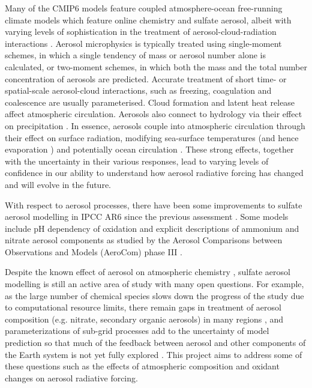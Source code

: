 Many of the CMIP6 models feature coupled atmosphere-ocean free-running climate models which feature online chemistry and sulfate aerosol, albeit with varying levels of sophistication in the treatment of aerosol-cloud-radiation interactions \citep[e.g.][]{zhangBCCESM1ModelDatasets2021, vannoijeECEarth3AerChemGlobalClimate2021, mulcahyDescriptionEvaluationAerosol2020}.  Aerosol microphysics is typically treated using single-moment schemes, in which a single tendency of mass or aerosol number alone is calculated, or two-moment schemes, in which both the mass and the total number concentration of aerosols are predicted.  Accurate treatment of short time- or spatial-scale aerosol-cloud interactions, such as freezing, coagulation and coalescence are usually parameterised. Cloud formation and latent heat release affect atmospheric circulation.  Aerosols also connect to hydrology via their effect on precipitation \citep{allenInterhemisphericAerosolRadiative2015}. In essence, aerosols couple into atmospheric circulation through their effect on surface radiation, modifying sea-surface temperatures (and hence evaporation \citep{boothAerosolsImplicatedPrime2012}) and potentially ocean circulation \citep{cowanResponseLargescaleOcean2013}. These strong effects, together with the uncertainty in their various responses, lead to varying levels of confidence in our ability to understand how aerosol radiative forcing has changed and will evolve in the future.


With respect to aerosol processes, there have been some improvements to sulfate aerosol modelling in IPCC AR6 since the previous assessment \citep{forsterEarthEnergyBudget2021}. Some models include pH dependency of  oxidation \citep[such as the NorESM1;][]{kirkevagProductiontaggedAerosolModule2018} and explicit descriptions of ammonium and nitrate aerosol components as studied by the Aerosol Comparisons between Observations and Models (AeroCom) phase III \citep{bianInvestigationGlobalParticulate2017}.


Despite the known effect of aerosol on atmospheric chemistry \citep[e.g.][]{oconnorApportionmentPreIndustrial2022}, sulfate aerosol modelling is still an active area of study with many open questions. For example, as the large number of chemical species slows down the progress of the study due to computational resource limits, there remain gaps in treatment of aerosol composition (e.g. nitrate, secondary organic aerosols) in many regions \citep[e.g.][]{mulcahyDescriptionEvaluationAerosol2020}, and parameterizations of sub-grid processes add to the uncertainty of model prediction so that much of the feedback between aerosol and other components of the Earth system is not yet fully explored \citep{seikiImprovementGlobalCloudSystemResolving2015}. This project aims to address some of these questions such as the effects of atmospheric composition and oxidant changes on aerosol radiative forcing.



